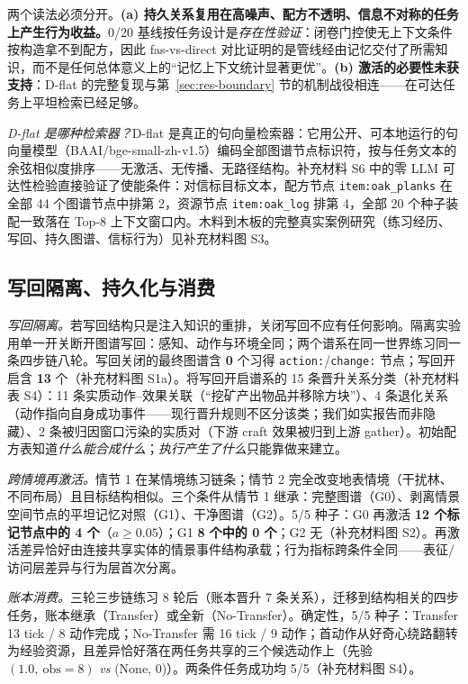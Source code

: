\documentclass[10pt,a4paper]{ctexart}
\begin{document}
两个读法必须分开。\textbf{(a) 持久关系复用在高噪声、配方不透明、信息不对称的任务上产生行为收益。}0/20 基线按任务设计是\emph{存在性验证}：闭卷门控使无上下文条件按构造拿不到配方，因此 fas-vs-direct 对比证明的是管线经由记忆交付了所需知识，而不是任何总体意义上的“记忆上下文统计显著更优”。\textbf{(b) 激活的必要性未获支持}：D-flat 的完整复现与第~\ref{sec:res-boundary} 节的机制战役相连——在可达任务上平坦检索已经足够。

\emph{D-flat 是哪种检索器？}D-flat 是真正的句向量检索器：它用公开、可本地运行的句向量模型（BAAI/bge-small-zh-v1.5）编码全部图谱节点标识符，按与任务文本的余弦相似度排序——无激活、无传播、无路径结构。补充材料 S6 中的零 LLM 可达性检验直接验证了使能条件：对信标目标文本，配方节点 \texttt{item:oak\_planks} 在全部 44 个图谱节点中排第 2，资源节点 \texttt{item:oak\_log} 排第 4，全部 20 个种子装配一致落在 Top-8 上下文窗口内。木料到木板的完整真实案例研究（练习经历、写回、持久图谱、信标行为）见补充材料图 S3。

\subsection{写回隔离、持久化与消费}
\label{sec:res-persist}

\emph{写回隔离。}若写回结构只是注入知识的重排，关闭写回不应有任何影响。隔离实验用单一开关断开图谱写回：感知、动作与环境全同；两个谱系在同一世界练习同一条四步链八轮。写回关闭的最终图谱含 \textbf{0} 个习得 \texttt{action:}/\texttt{change:} 节点；写回开启含 \textbf{13} 个（补充材料图 S1a）。将写回开启谱系的 15 条晋升关系分类（补充材料表 S4）：11 条实质动作--效果关联（“挖矿产出物品并移除方块”）、4 条退化关系（动作指向自身成功事件——现行晋升规则不区分该类；我们如实报告而非隐藏）、2 条被归因窗口污染的实质对（下游 craft 效果被归到上游 gather）。初始配方表知道\emph{什么能合成什么}；\emph{执行产生了什么}只能靠做来建立。

\emph{跨情境再激活。}情节 1 在某情境练习链条；情节 2 完全改变地表情境（干扰林、不同布局）且目标结构相似。三个条件从情节 1 继承：完整图谱（G0）、剥离情景空间节点的平坦记忆对照（G1）、干净图谱（G2）。5/5 种子：G0 再激活 \textbf{12 个标记节点中的 4 个}（$a\ge0.05$）；G1 \textbf{8 个中的 0 个}；G2 无（补充材料图 S2）。再激活差异恰好由连接共享实体的情景事件结构承载；行为指标跨条件全同——表征/访问层差异与行为层首次分离。

\emph{账本消费。}三轮三步链练习 8 轮后（账本晋升 7 条关系），迁移到结构相关的四步任务，账本继承（Transfer）或全新（No-Transfer）。确定性，5/5 种子：Transfer 13 tick / 8 动作完成；No-Transfer 需 16 tick / 9 动作；首动作从好奇心绕路翻转为经验资源，且差异恰好落在两任务共享的三个候选动作上（先验 $(1.0,\ \text{obs}{=}8)$ \emph{vs} (None, 0)）。两条件任务成功均 5/5（补充材料图 S4）。
\end{document}
